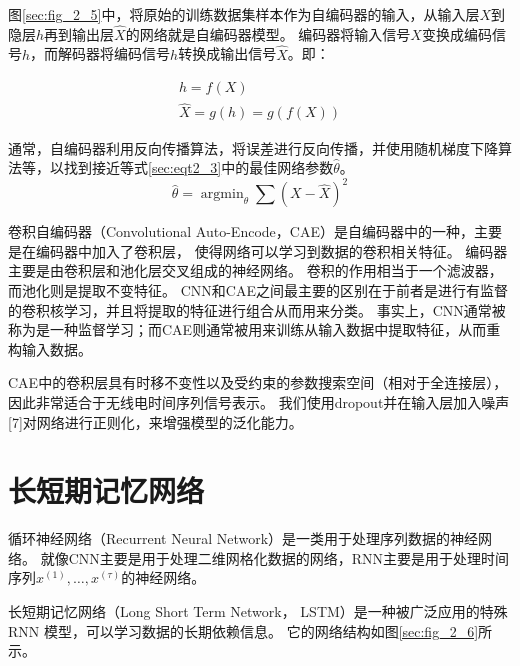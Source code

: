 图\ref{sec:fig_2_5}中，将原始的训练数据集样本作为自编码器的输入，从输入层$X$到隐层$h$再到输出层$\hat{X}$的网络就是自编码器模型。
编码器将输入信号$X$变换成编码信号$h$，而解码器将编码信号$h$转换成输出信号$\hat{X}$。即：\par

\begin{equation}
	\begin{gathered}
		h=f(X)
		\\
		\hat{X}=g(h)=g(f(X))
	\end{gathered}
\end{equation}

通常，自编码器利用反向传播算法，将误差进行反向传播，并使用随机梯度下降算法等，以找到接近等式\eqref{sec:eqt2_3}中的最佳网络参数$\hat{\theta}$。
\begin{equation}\label{sec:eqt2_3}
	\hat{\theta} = \mathop{\arg\min}_{\theta} \sum(X − \hat{X})^2
\end{equation}

卷积自编码器（Convolutional Auto-Encode，CAE）是自编码器中的一种，主要是在编码器中加入了卷积层，
使得网络可以学习到数据的卷积相关特征。
编码器主要是由卷积层和池化层交叉组成的神经网络。
卷积的作用相当于一个滤波器，而池化则是提取不变特征。
CNN和CAE之间最主要的区别在于前者是进行有监督的卷积核学习，并且将提取的特征进行组合从而用来分类。
事实上，CNN通常被称为是一种监督学习；而CAE则通常被用来训练从输入数据中提取特征，从而重构输入数据。\par

CAE中的卷积层具有时移不变性以及受约束的参数搜索空间（相对于全连接层），因此非常适合于无线电时间序列信号表示。
我们使用dropout并在输入层加入噪声[7]对网络进行正则化，来增强模型的泛化能力。\par

\section{长短期记忆网络}

循环神经网络（Recurrent Neural Network）是一类用于处理序列数据的神经网络。
就像CNN主要是用于处理二维网格化数据的网络，RNN主要是用于处理时间序列$x^{(1)}, \dots, x^{(\tau)}$的神经网络。\par

长短期记忆网络（Long Short Term Network， LSTM）是一种被广泛应用的特殊 RNN 模型，可以学习数据的长期依赖信息。
它的网络结构如图\ref{sec:fig_2_6}所示。\par

